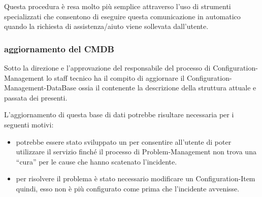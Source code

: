Questa procedura è resa molto più semplice attraverso l'uso di strumenti  specializzati che consentono di eseguire questa comunicazione in automatico quando la richiesta di assistenza/aiuto viene sollevata dall'utente.

\subsubsection[Aggiornamento del CMDB]{aggiornamento del CMDB}
Sotto la direzione e l'approvazione del responsabile del processo di \ac{Configuration-Management} lo staff tecnico ha il compito di aggiornare il \ac{Configuration-Management-DataBase} ossia il  contenente la descrizione della struttura attuale e passata dei  presenti.

L'aggiornamento di questa base di dati potrebbe risultare necessaria per i seguenti motivi:

\begin{itemize}
\item{potrebbe essere stato sviluppato un  per consentire all'utente di poter utilizzare il servizio finché il processo di \ac{Problem-Management} non trova una ``cura'' per le cause che hanno scatenato l'incidente.}
\item{per risolvere il problema è stato necessario modificare un \ac{Configuration-Item} quindi, esso non è più configurato come prima che l'incidente avvenisse.}
\end{itemize}